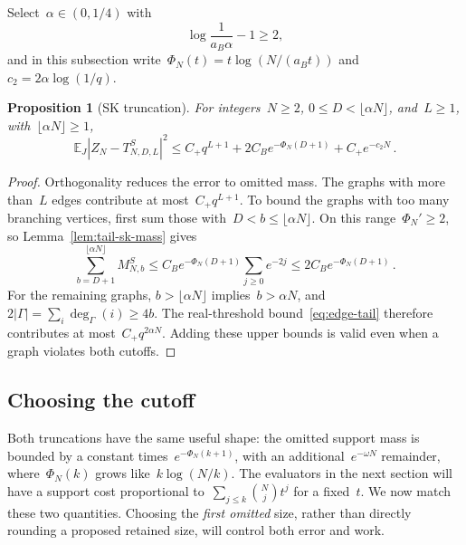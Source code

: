 \documentclass[10pt]{article}
\theoremstyle{plain}
\newtheorem{proposition}[theorem]{Proposition}
\theoremstyle{definition}
\theoremstyle{remark}
\begin{document}
Select~$\alpha\in(0,1/4)$ with
\begin{equation}\label{eq:tail-sk-alpha}
 \log\frac1{a_B\alpha}-1\ge2,
\end{equation}
and in this subsection write~$\Phi_N(t)=t\log(N/(a_Bt))$ and~$c_2=2\alpha\log(1/q)$.
\begin{proposition}[SK truncation]\label{prop:tail-sk}
For integers~$N\ge2$, $0\le D<\lfloor\alpha N\rfloor$, and~$L\ge1$, with~$\lfloor\alpha N\rfloor\ge1$,
\begin{equation}\label{eq:tail-sk-truncation}
 \mathbb E_J|\hat Z_N-T^S_{N,D,L}|^2
 \le C_+q^{L+1}+2C_Be^{-\Phi_N(D+1)}+C_+e^{-c_2N}\,.
\end{equation}
\end{proposition}
\begin{proof}
Orthogonality reduces the error to omitted mass. The graphs with more than~$L$ edges contribute at most~$C_+q^{L+1}$. To bound the graphs with too many branching vertices, first sum those with~$D<b\le\lfloor\alpha N\rfloor$. On this range~$\Phi_N'\ge2$, so Lemma~\ref{lem:tail-sk-mass} gives
\begin{equation*}
 \sum_{b=D+1}^{\lfloor\alpha N\rfloor}M^S_{N,b}
 \le C_Be^{-\Phi_N(D+1)}\sum_{j\ge0}e^{-2j}
 \le2C_Be^{-\Phi_N(D+1)}\,.
\end{equation*}
For the remaining graphs, $b>\lfloor\alpha N\rfloor$ implies~$b>\alpha N$, and~$2|\Gamma|=\sum_i\deg_\Gamma(i)\ge4b$. The real-threshold bound~\eqref{eq:edge-tail} therefore contributes at most~$C_+q^{2\alpha N}$. Adding these upper bounds is valid even when a graph violates both cutoffs.
\end{proof}

\subsection{Choosing the cutoff}\label{sec:uniform}
Both truncations have the same useful shape: the omitted support mass is bounded by a constant times~$e^{-\Phi_N(k+1)}$, with an additional~$e^{-\omega N}$ remainder, where~$\Phi_N(k)$ grows like~$k\log(N/k)$. The evaluators in the next section will have a support cost proportional to~$\sum_{j\le k}\binom Nj t^j$ for a fixed~$t$. We now match these two quantities. Choosing the \emph{first omitted} size, rather than directly rounding a proposed retained size, will control both error and work.
\end{document}

